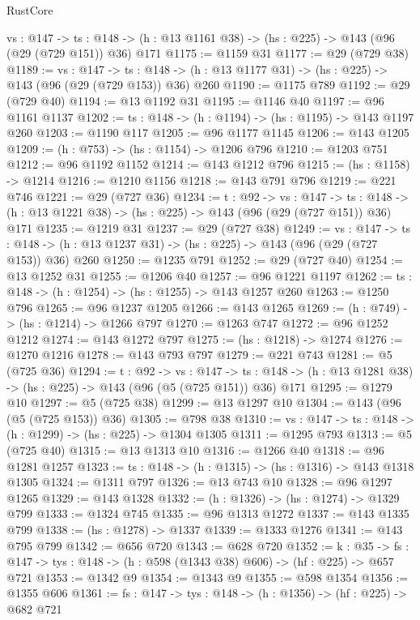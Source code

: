 \begin{lexlean}{RustCore}
\begin{coremodule}
  {vs : @147} ->
  {ts : @148} -> (h : @13 @1161 @38) -> (hs : @225) -> @143 (@96 (@29 (@729 @151)) @36) @171
@1175 := @1159 @31
@1177 := @29 (@729 @38)
@1189 := {vs : @147} ->
  {ts : @148} -> (h : @13 @1177 @31) -> (hs : @225) -> @143 (@96 (@29 (@729 @153)) @36) @260
@1190 := @1175 @789
@1192 := @29 (@729 @40)
@1194 := @13 @1192 @31
@1195 := @1146 @40
@1197 := @96 @1161 @1137
@1202 := {ts : @148} -> (h : @1194) -> (hs : @1195) -> @143 @1197 @260
@1203 := @1190 @117
@1205 := @96 @1177 @1145
@1206 := @143 @1205
@1209 := (h : @753) -> (hs : @1154) -> @1206 @796
@1210 := @1203 @751
@1212 := @96 @1192 @1152
@1214 := @143 @1212 @796
@1215 := (hs : @1158) -> @1214
@1216 := @1210 @1156
@1218 := @143 @791 @796
@1219 := @221 @746
@1221 := @29 (@727 @36)
@1234 := {t : @92} ->
  {vs : @147} ->
  {ts : @148} -> (h : @13 @1221 @38) -> (hs : @225) -> @143 (@96 (@29 (@727 @151)) @36) @171
@1235 := @1219 @31
@1237 := @29 (@727 @38)
@1249 := {vs : @147} ->
  {ts : @148} -> (h : @13 @1237 @31) -> (hs : @225) -> @143 (@96 (@29 (@727 @153)) @36) @260
@1250 := @1235 @791
@1252 := @29 (@727 @40)
@1254 := @13 @1252 @31
@1255 := @1206 @40
@1257 := @96 @1221 @1197
@1262 := {ts : @148} -> (h : @1254) -> (hs : @1255) -> @143 @1257 @260
@1263 := @1250 @796
@1265 := @96 @1237 @1205
@1266 := @143 @1265
@1269 := (h : @749) -> (hs : @1214) -> @1266 @797
@1270 := @1263 @747
@1272 := @96 @1252 @1212
@1274 := @143 @1272 @797
@1275 := (hs : @1218) -> @1274
@1276 := @1270 @1216
@1278 := @143 @793 @797
@1279 := @221 @743
@1281 := @5 (@725 @36)
@1294 := {t : @92} ->
  {vs : @147} ->
  {ts : @148} -> (h : @13 @1281 @38) -> (hs : @225) -> @143 (@96 (@5 (@725 @151)) @36) @171
@1295 := @1279 @10
@1297 := @5 (@725 @38)
@1299 := @13 @1297 @10
@1304 := @143 (@96 (@5 (@725 @153)) @36)
@1305 := @798 @38
@1310 := {vs : @147} -> {ts : @148} -> (h : @1299) -> (hs : @225) -> @1304 @1305
@1311 := @1295 @793
@1313 := @5 (@725 @40)
@1315 := @13 @1313 @10
@1316 := @1266 @40
@1318 := @96 @1281 @1257
@1323 := {ts : @148} -> (h : @1315) -> (hs : @1316) -> @143 @1318 @1305
@1324 := @1311 @797
@1326 := @13 @743 @10
@1328 := @96 @1297 @1265
@1329 := @143 @1328
@1332 := (h : @1326) -> (hs : @1274) -> @1329 @799
@1333 := @1324 @745
@1335 := @96 @1313 @1272
@1337 := @143 @1335 @799
@1338 := (hs : @1278) -> @1337
@1339 := @1333 @1276
@1341 := @143 @795 @799
@1342 := @656 @720
@1343 := @628 @720
@1352 := {k : @35} ->
  {fs : @147} -> {tys : @148} -> (h : @598 (@1343 @38) @606) -> (hf : @225) -> @657 @721
@1353 := @1342 @9
@1354 := @1343 @9
@1355 := @598 @1354
@1356 := @1355 @606
@1361 := {fs : @147} -> {tys : @148} -> (h : @1356) -> (hf : @225) -> @682 @721

\end{coremodule}
\end{lexlean}

